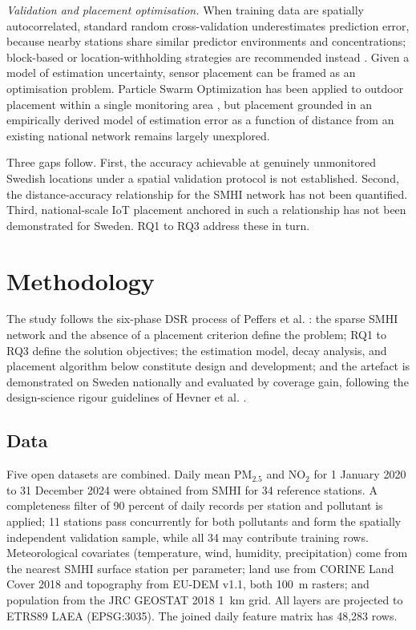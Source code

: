 \documentclass[conference]{IEEEtran}
\begin{document}
\textit{Validation and placement optimisation.} When training data are
spatially autocorrelated, standard random cross-validation underestimates
prediction error, because nearby stations share similar predictor environments
and concentrations; block-based or location-withholding strategies are
recommended instead \cite{roberts_spatial_cv_2017, valavi_blockcv_2019}. Given
a model of estimation uncertainty, sensor placement can be framed as an
optimisation problem. Particle Swarm Optimization has been applied to outdoor
placement within a single monitoring area \cite{gupta_pso_placement_2023, pso_node_deployment_2024},
but placement grounded in an empirically derived
model of estimation error as a function of distance from an existing national
network remains largely unexplored.

Three gaps follow. First, the accuracy achievable at genuinely unmonitored
Swedish locations under a spatial validation protocol is not established.
Second, the distance-accuracy relationship for the SMHI network has not been
quantified. Third, national-scale IoT placement anchored in such a
relationship has not been demonstrated for Sweden. RQ1 to RQ3 address these in
turn.

\section{Methodology}
\label{sec:method}

The study follows the six-phase DSR process of Peffers et al.
\cite{peffers_dsr_2007}: the sparse SMHI network and the absence of a
placement criterion define the problem; RQ1 to RQ3 define the solution
objectives; the estimation model, decay analysis, and placement algorithm
below constitute design and development; and the artefact is demonstrated on
Sweden nationally and evaluated by coverage gain, following the design-science
rigour guidelines of Hevner et al. \cite{hevner_design_science_2004}.

\subsection{Data}
\label{sec:method-data}

Five open datasets are combined. Daily mean PM$_{2.5}$ and NO$_2$ for 1
January 2020 to 31 December 2024 were obtained from SMHI for 34 reference
stations. A completeness filter of 90 percent of daily records per station and
pollutant is applied; 11 stations pass concurrently for both pollutants and
form the spatially independent validation sample, while all 34 may contribute
training rows. Meteorological covariates (temperature, wind, humidity,
precipitation) come from the nearest SMHI surface station per parameter; land
use from CORINE Land Cover 2018 and topography from EU-DEM v1.1, both 100~m
rasters; and population from the JRC GEOSTAT 2018 1~km grid. All layers are
projected to ETRS89 LAEA (EPSG:3035). The joined daily feature matrix has
48{,}283 rows.
\end{document}
